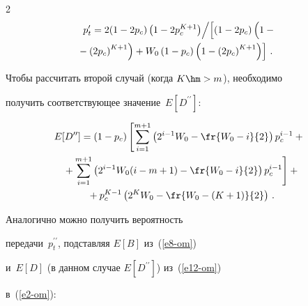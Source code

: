 \begin{multicols}{2}
    \begin{multline}


    p^\prime_t = 2(1-2p_c) \left(1-2p_c^{K+1}\right)\!\Big /\!


    \left[ \left(1-2p_c\right) 


\left( \vphantom{\left(2p_c\right)^{K+1}}


1-{}\right.\right.\\


\hspace*{-5mm}\left.\left.{}-\left(2p_c\right)^{K+1}\right) 


+ W_0 \left(1-p_c\right) \left(1-\left(2p_c\right)^{K+1}\right)\right]\,.


    \label{e11-om}


    \end{multline}


    


    Чтобы рассчитать второй случай (когда $K\hm>m$), необходимо 


получить соответствующее значение~$E[D^{\prime\prime}]$:


    \begin{multline}


   \! E[D^{\prime\prime}] = (1-p_c) \left[ \sum\limits_{i=1}^{m+1} \left( 


2^{i-1}W_0 -\fr{W_0-i}{2}\right) p_c^{i-1}+ {}\right.\\


\left.{}+


    \sum\limits_{i=1}^{m+1} \left( 2^{i-1}W_0(i-m+1)-\fr{W_0-i}{2}\right) 


p_c^{i-1}\right] + {}\\


{}+p_c^{K-1} \left( 2^KW_0 - \fr{W_0-(K+1)}{2}\right)\,.


\label{e12-om}


    \end{multline}


     


     Аналогично можно получить вероятность 


передачи~$p^{\prime\prime}_t$, подставляя $E[B]$ из~(\ref{e8-om}) 


и~$E[D]$ (в данном случае $E[D^{\prime\prime}]$) из~(\ref{e12-om}) 


в~(\ref{e2-om}):


    \begin{multline}



\end{multline}
\end{multicols}

